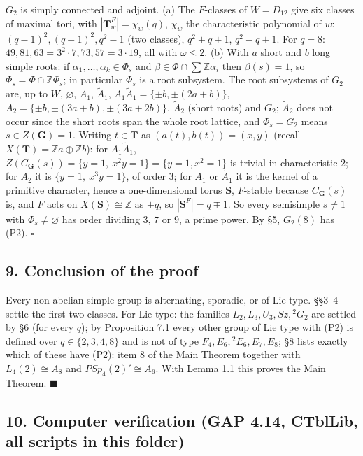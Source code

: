 \documentclass[11pt,a4paper]{article}
\begin{document}
\(G_2\) is simply connected and adjoint. (a) The \(F\)-classes of
\(W=D_{12}\) give six classes of maximal tori, with
\(|\mathbf T_w^F|=\chi_w(q)\), \(\chi_w\) the characteristic polynomial
of \(w\): \((q-1)^2,(q+1)^2,q^2-1\) (two classes), \(q^2+q+1\),
\(q^2-q+1\). For \(q=8\): \(49,81,63=3^2\cdot7,73,57=3\cdot19\), all
with \(\omega\le2\). (b) With \(a\) short and \(b\) long simple roots:
if \(\alpha_1,\dots,\alpha_k\in\Phi_s\) and
\(\beta\in\Phi\cap\sum\mathbb Z\alpha_i\) then \(\beta(s)=1\), so
\(\Phi_s=\Phi\cap\mathbb Z\Phi_s\); in particular \(\Phi_s\) is a root
subsystem. The root subsystems of \(G_2\) are, up to \(W\),
\(\varnothing\), \(A_1\), \(\tilde A_1\),
\(A_1\tilde A_1=\{\pm b,\pm(2a+b)\}\),
\(A_2=\{\pm b,\pm(3a+b),\pm(3a+2b)\}\), \(\tilde A_2\) (short roots) and
\(G_2\); \(\tilde A_2\) does not occur since the short roots span the
whole root lattice, and \(\Phi_s=G_2\) means \(s\in Z(\mathbf G)=1\).
Writing \(t\in\mathbf T\) as \((a(t),b(t))=(x,y)\) (recall
\(X(\mathbf T)=\mathbb Za\oplus\mathbb Zb\)): for \(A_1\tilde A_1\),
\(Z(C_{\mathbf G}(s))=\{y=1,\ x^2y=1\}=\{y=1,x^2=1\}\) is trivial in
characteristic \(2\); for \(A_2\) it is \(\{y=1,\ x^3y=1\}\), of order
\(3\); for \(A_1\) or \(\tilde A_1\) it is the kernel of a primitive
character, hence a one-dimensional torus \(\mathbf S\), \(F\)-stable
because \(C_{\mathbf G}(s)\) is, and \(F\) acts on
\(X(\mathbf S)\cong\mathbb Z\) as \(\pm q\), so \(|\mathbf S^F|=q\mp1\).
So every semisimple \(s\ne1\) with \(\Phi_s\ne\varnothing\) has order
dividing \(3\), \(7\) or \(9\), a prime power. By §5, \(G_2(8)\) has
(P2). \(\square\)

\subsection{9. Conclusion of the proof}\label{conclusion-of-the-proof}

Every non-abelian simple group is alternating, sporadic, or of Lie type.
§§3--4 settle the first two classes. For Lie type: the families
\(L_2,L_3,U_3,Sz,{}^2G_2\) are settled by §6 (for every \(q\)); by
Proposition 7.1 every other group of Lie type with (P2) is defined over
\(q\in\{2,3,4,8\}\) and is not of type \(F_4,E_6,{}^2E_6,E_7,E_8\); §8
lists exactly which of these have (P2): item 8 of the Main Theorem
together with \(L_4(2)\cong A_8\) and \(PSp_4(2)'\cong A_6\). With Lemma
1.1 this proves the Main Theorem. \(\blacksquare\)

\subsection{10. Computer verification (GAP 4.14, CTblLib, all scripts in
this
folder)}\label{computer-verification-gap-4.14-ctbllib-all-scripts-in-this-folder}
\end{document}
